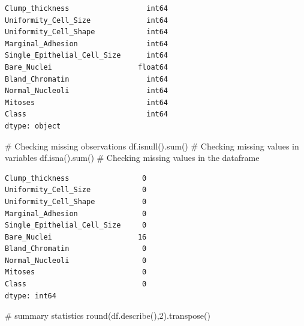 \documentclass[
  letterpaper,
  DIV=11,
  numbers=noendperiod]{scrreprt}
\newenvironment{Shaded}{\begin{snugshade}}{\end{snugshade}}
\newcommand{\BuiltInTok}[1]{\textcolor[rgb]{0.00,0.23,0.31}{#1}}
\newcommand{\CommentTok}[1]{\textcolor[rgb]{0.37,0.37,0.37}{#1}}
\newcommand{\DecValTok}[1]{\textcolor[rgb]{0.68,0.00,0.00}{#1}}
\newcommand{\NormalTok}[1]{\textcolor[rgb]{0.00,0.23,0.31}{#1}}
\begin{document}
\begin{verbatim}
Clump_thickness                  int64
Uniformity_Cell_Size             int64
Uniformity_Cell_Shape            int64
Marginal_Adhesion                int64
Single_Epithelial_Cell_Size      int64
Bare_Nuclei                    float64
Bland_Chromatin                  int64
Normal_Nucleoli                  int64
Mitoses                          int64
Class                            int64
dtype: object
\end{verbatim}

\begin{Shaded}
\begin{Highlighting}[]
\CommentTok{\# Checking missing observations }
\NormalTok{df.isnull().}\BuiltInTok{sum}\NormalTok{() }\CommentTok{\# Checking missing values in variables}
\NormalTok{df.isna().}\BuiltInTok{sum}\NormalTok{() }\CommentTok{\# Checking missing values in the dataframe }
\end{Highlighting}
\end{Shaded}

\begin{verbatim}
Clump_thickness                 0
Uniformity_Cell_Size            0
Uniformity_Cell_Shape           0
Marginal_Adhesion               0
Single_Epithelial_Cell_Size     0
Bare_Nuclei                    16
Bland_Chromatin                 0
Normal_Nucleoli                 0
Mitoses                         0
Class                           0
dtype: int64
\end{verbatim}

\begin{Shaded}
\begin{Highlighting}[]
\CommentTok{\# summary statistics }
\BuiltInTok{round}\NormalTok{(df.describe(),}\DecValTok{2}\NormalTok{).transpose()}
\end{Highlighting}
\end{Shaded}
\end{document}
